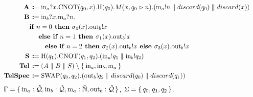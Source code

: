 \begin{align*}
  \proc{A} &\Coloneqq \text{in}_a?x.\text{CNOT}(q_0, x).\text{H}(q_0).M(x,q_0 \rhd n).(\text{m}_a!n \parallel discard(q_0) \parallel discard(x) )\\
  \proc{B} &\Coloneqq \text{in}_b?x.\text{m}_a?n.
     \\ & \ite{n = 0}{\sigma_0(x).\text{out}_b!x\\&\quad}
    {\ite{n = 1}{\sigma_1(x).\text{out}_b!x\\&\qquad}
    		{\ite{n = 2}{\sigma_2(x).\text{out}_b!x}{\sigma_3(x).\text{out}_b!x}}
    }
\\
  \proc{S} &\Coloneqq \text{H}(q_1).\text{CNOT}(q_1, q_2).(\text{in}_a!q_1 \parallel \text{in}_b!q_2) \\
  \proc{Tel} &\Coloneqq (A \parallel B \parallel S) \setminus \Set{\text{in}_a, \text{in}_b, \text{m}_a } \\
  \proc{TelSpec} &\Coloneqq \text{SWAP}(q_0,q_2).(\text{out}_b!q_2 \parallel discard(q_0) \parallel discard(q_1))
\end{align*}
$\Gamma = \set{\text{in}_a : \hat{\mathcal{Q}}, \text{in}_b : \hat{\mathcal{Q}}, \text{m}_a : \hat{\mathbb{N}}, \text{out}_b : \hat{\mathcal{Q}}}$, $\Sigma = \set{q_0, q_1, q_2}$.